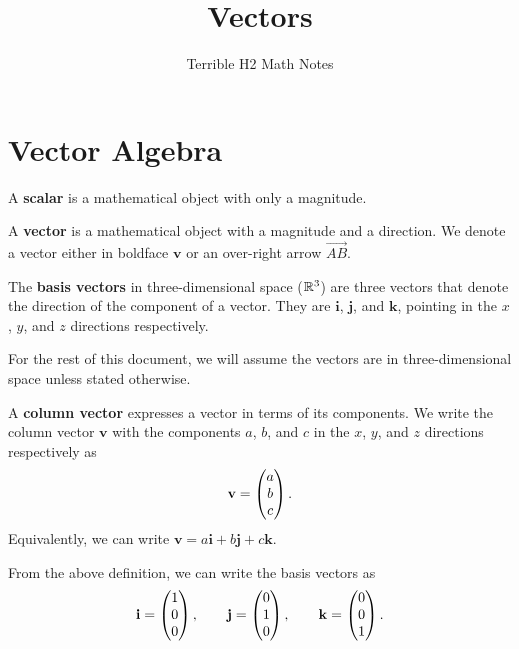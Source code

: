 \documentclass[12pt]{article}
\title{Vectors}
\author{Terrible H2 Math Notes}
\renewcommand{\vec}{\mathbf}
\begin{document}
\maketitle

\section{Vector Algebra}

\begin{defn}[Scalar]
	A \textbf{scalar} is a mathematical object with only a magnitude.
\end{defn}

\begin{defn}[Vector]
	A \textbf{vector} is a mathematical object with a magnitude and a direction.
	We denote a vector either in boldface \(\vec{v}\) or an over-right arrow \(\overrightarrow{AB}\).
\end{defn}

\begin{defn}
	The \textbf{basis vectors} in three-dimensional space (\(\mathbb{R}^3\)) are three vectors that denote the direction of the component of a vector.
	They are \(\vec{i}\), \(\vec{j}\), and \(\vec{k}\), pointing in the \(x\), \(y\), and \(z\) directions respectively.
\end{defn}

For the rest of this document, we will assume the vectors are in three-dimensional space unless stated otherwise. 

\begin{defn}
	A \textbf{column vector} expresses a vector in terms of its components.
	We write the column vector \(\vec{v}\) with the components \(a\), \(b\), and \(c\) in the \(x\), \(y\), and \(z\) directions respectively as
	\[ \vec{v} = \cvec{a \\ b \\ c}. \] 
	Equivalently, we can write \(\vec{v} = a\vec{i} + b\vec{j} + c\vec{k}\).
\end{defn}

From the above definition, we can write the basis vectors as 
\[ \vec{i} = \cvec{1 \\ 0 \\ 0}, \qquad \vec{j} = \cvec{0 \\ 1 \\ 0}, \qquad \vec{k} = \cvec{0 \\ 0 \\ 1}. \] 
\end{document}
